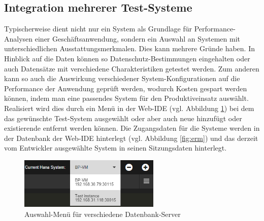 \subsection{Integration mehrerer Test-Systeme}
Typischerweise dient nicht nur ein System als Grundlage für Performance-Analysen einer Geschäftsanwendung, sondern ein Auswahl an Systemen mit unterschiedlichen Ausstattungsmerkmalen.
Dies kann mehrere Gründe haben.
In Hinblick auf die Daten können so Datenschutz-Bestimmungen eingehalten oder auch Datensätze mit verschiedene Charakteristiken getestet werden.
Zum anderen kann so auch die Auswirkung verschiedener System-Konfigurationen auf die Performance der Anwendung geprüft werden, wodurch Kosten gespart werden können, indem man eine passendes System für den Produktiveinsatz auswählt.
Realisiert wird dies durch ein Menü in der Web-IDE (vgl. Abbildung \ref{fig:hanainstances}) bei dem das gewünschte Test-System ausgewählt oder aber auch neue hinzufügt oder existierende entfernt werden können.
Die Zugangsdaten für die Systeme werden in der Datenbank der Web-IDE hinterlegt (vgl. Abbildung \ref{fig:erm}) und das derzeit vom Entwickler ausgewählte System in seinen Sitzungsdaten hinterlegt.
\begin{figure}[ht]
	\centering
  \includegraphics[width=0.6\textwidth]{figures/hana-instances.png}
	\caption{Auswahl-Menü für verschiedene Datenbank-Server}
	\label{fig:hanainstances}
\end{figure}

